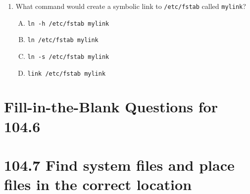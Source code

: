 \documentclass[a4paper]{report}
\begin{document}
\begin{enumerate}[1.]
    \item What command would create a symbolic link to \texttt{/etc/fstab} called \texttt{mylink}?  
    \begin{enumerate}[A)]
        \item \texttt{ln -h /etc/fstab mylink}  
        \item \texttt{ln /etc/fstab mylink}  
        \item \texttt{ln -s /etc/fstab mylink}  
        \item \texttt{link /etc/fstab mylink}  
    \end{enumerate}

\end{enumerate}


\newpage
\section*{Fill-in-the-Blank Questions for 104.6}

\newpage
\section*{104.7 Find system files and place files in the correct location}

\newpage
\end{document}
